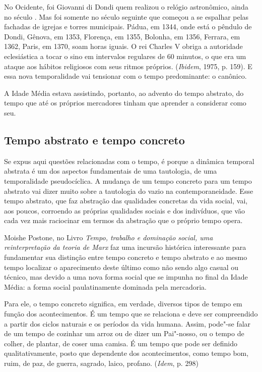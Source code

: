 No Ocidente, foi Giovanni di Dondi quem realizou o relógio astronômico,
ainda no século . Mas foi somente no século seguinte que começou a
se espalhar pelas fachadas de igrejas e torres municipais. Pádua, em
1344, onde está o pêndulo de Dondi, Gênova, em 1353, Florença, em 1355,
Bolonha, em 1356, Ferrara, em 1362, Paris, em 1370, soam horas iguais. O
rei Charles V obriga a autoridade eclesiástica a tocar o sino em
intervalos regulares de 60 minutos, o que era um ataque aos hábitos
religiosos com seus ritmos próprios. (\emph{Ibidem}, 1975, p. 159). E
essa nova temporalidade vai tensionar com o tempo predominante: o
canônico.

A Idade Média estava assistindo, portanto, ao advento do tempo abstrato,
do tempo que até os próprios mercadores tinham que aprender a considerar
como seu.

\subsection{Tempo abstrato e tempo concreto}

Se expus aqui questões relacionadas com o tempo, é porque a dinâmica
temporal abstrata é um dos aspectos fundamentais de uma tautologia, de
uma temporalidade pseudocíclica. A mudança de um tempo concreto para um
tempo abstrato vai dizer muito sobre a tautologia do vazio na
contemporaneidade. Esse tempo abstrato,
que faz abstração das qualidades concretas da vida social, vai, aos
poucos, corroendo as próprias qualidades sociais e dos indivíduos, que
vão cada vez mais raciocinar em termos da abstração que o próprio tempo
opera.

Moishe Postone, no Livro \emph{Tempo, trabalho e dominação social, uma
reinterpretação da teoria de Marx} faz uma incursão histórica
interessante para fundamentar sua distinção entre tempo concreto e tempo
abstrato e ao mesmo tempo localizar o aparecimento deste último como não
sendo algo casual ou técnico, mas devido a uma nova forma social que se
impunha no final da Idade Média: a forma social paulatinamente dominada
pela mercadoria.

Para ele, o tempo concreto significa, em verdade, diversos tipos de
tempo em função dos acontecimentos. É um tempo que se relaciona e deve
ser compreendido a partir dos ciclos naturais e os períodos da vida
humana. Assim, pode"-se falar de um tempo de cozinhar um arroz ou de
dizer um Pai"-nosso, ou o tempo de colher, de plantar, de coser uma
camisa. É um tempo que pode ser definido qualitativamente, posto que
dependente dos acontecimentos, como tempo bom, ruim, de paz, de guerra,
sagrado, laico, profano. (\emph{Idem}, p. 298)

